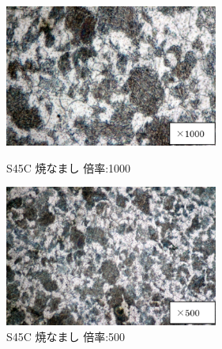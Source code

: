 \documentclass[10pt，a4j]{jsarticle}
\begin{document}
  \begin{figure}[htbp]
    \begin{minipage}{0.5\hsize}
      \begin{center}
        \includegraphics[width=7cm]{../img/S45C_yakinamashi_1000.png}
        \caption{S45C 焼なまし 倍率:1000}
      \end{center}
    \end{minipage}
    \begin{minipage}{0.5\hsize}
      \begin{center}
        \includegraphics[width=7cm]{../img/S45C_yakinamashi_500.png}
        \caption{S45C 焼なまし 倍率:500}
      \end{center}
    \end{minipage}
  \end{figure}
\end{document}
